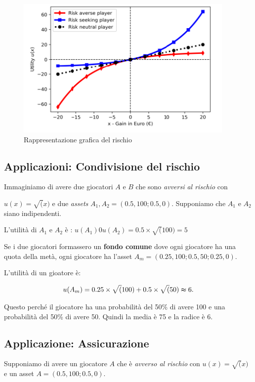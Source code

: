\begin{figure}[H]
    \centering
    \includegraphics[scale=0.7]{chapters/images/rishio.png}
    \caption{Rappresentazione grafica del rischio}
    \label{fig:rischio}
\end{figure}

\subsection{Applicazioni: Condivisione del rischio}

Immaginiamo di avere due giocatori $A$ e $B$ che sono \textit{avversi al
    rischio} con

$u(x) = \sqrt(x)$ e due \textit{assets} $A_1, A_2 = (0.5, 100; 0.5, 0)$. Supponiamo che $A_1$ e $A_2$ siano indipendenti.

L'utilità di $A_1$ e $A_2$ è : $u(A_1) 0 u(A_2) = 0.5 \times \sqrt(100) = 5$

Se i due giocatori formassero un \textbf{fondo comune} dove ogni giocatore ha
una quota della metà, ogni giocatore ha l'asset $A_m = (0.25, 100; 0.5, 50;
    0.25, 0)$.

L'utilità di un gioatore è:

\[
    u(A_m) = 0.25 \times \sqrt(100) + 0.5 \times \sqrt(50) \thickapprox 6.
\]

Questo perché il giocatore ha una probabilità del 50\% di avere 100 e una
probabilità del 50\% di avere 50. Quindi la media è 75 e la radice è 6.

\subsection{Applicazione: Assicurazione}

Supponiamo di avere un giocatore $A$ che è \textit{avverso al rischio} con
$u(x) = \sqrt(x)$ e un asset $A = (0.5, 100; 0.5, 0)$.


